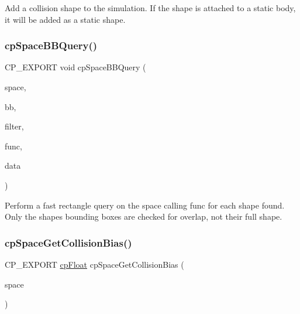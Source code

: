 Add a collision shape to the simulation. If the shape is attached to a static body, it will be added as a static shape. \mbox{\label{group__cp_space_ga09e4737a3b33755ee20066297138b64e}} 
\subsubsection{\texorpdfstring{cp\+Space\+B\+B\+Query()}{cpSpaceBBQuery()}}
{\footnotesize\ttfamily C\+P\+\_\+\+E\+X\+P\+O\+RT void cp\+Space\+B\+B\+Query (\begin{DoxyParamCaption}\item[{\mbox{\hyperlink{structcp_space}{cp\+Space}} $\ast$}]{space,  }\item[{\mbox{\hyperlink{structcp_b_b}{cp\+BB}}}]{bb,  }\item[{\mbox{\hyperlink{structcp_shape_filter}{cp\+Shape\+Filter}}}]{filter,  }\item[{\mbox{\hyperlink{group__cp_space_ga02779238e9b8c07797aae6139fad203c}{cp\+Space\+B\+B\+Query\+Func}}}]{func,  }\item[{void $\ast$}]{data }\end{DoxyParamCaption})}

Perform a fast rectangle query on the space calling {\ttfamily func} for each shape found. Only the shape\textquotesingle{}s bounding boxes are checked for overlap, not their full shape. \mbox{\label{group__cp_space_ga53b093e1cbb978e00faf9216e1f9ab4f}} 
\subsubsection{\texorpdfstring{cp\+Space\+Get\+Collision\+Bias()}{cpSpaceGetCollisionBias()}}
{\footnotesize\ttfamily C\+P\+\_\+\+E\+X\+P\+O\+RT \mbox{\hyperlink{group__basic_types_gac1ed65573e035bf892505768c852d8d3}{cp\+Float}} cp\+Space\+Get\+Collision\+Bias (\begin{DoxyParamCaption}\item[{const \mbox{\hyperlink{structcp_space}{cp\+Space}} $\ast$}]{space }\end{DoxyParamCaption})}

